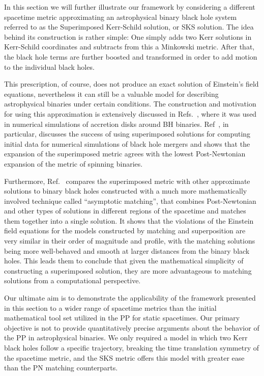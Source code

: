 In this section we will further illustrate our framework by considering a different spacetime metric approximating an astrophysical binary black hole system referred to as the Superimposed Kerr-Schild solution, or SKS solution. The idea behind its construction is rather simple: One simply adds two Kerr solutions in Kerr-Schild coordinates and subtracts from this a Minkowski metric. After that, the black hole terms are further boosted and transformed in order to add motion to the individual black holes.

This prescription, of course, does not produce an exact solution of Einstein's field equations, nevertheless it can still be a valuable model for describing astrophysical binaries under certain conditions. The construction and motivation for using this approximation is extensively discussed in Refs.~\cite{Armengol:2021shd, PhysRevD.104.044041}, where it was  used in numerical simulations of accretion disks around BH binaries. Ref~\cite{Armengol:2021shd}, in particular, discusses the success of using superimposed solutions for computing initial data for numerical simulations of black hole mergers and shows that the expansion of the superimposed metric agrees with the lowest Post-Newtonian expansion of the metric of spinning binaries.

Furthermore, Ref.~\cite{PhysRevD.104.044041} compares the superimposed metric with other approximate solutions to binary black holes constructed with a much more mathematically involved technique called ``asymptotic matching'', that combines Post-Newtonian and other types of solutions in different regions of the spacetime and matches them together into a single solution. It shows that the violations of the Einstein field equations for the models constructed by matching and superposition are very similar in their order of magnitude and profile, with the matching solutions being more well-behaved and smooth at larger distances from the binary black holes. This leads them to conclude that given the mathematical simplicity of constructing a superimposed solution, they are more advantageous to matching solutions from a computational perspective.

Our ultimate aim is to demonstrate the applicability of the framework presented in this section to a wider range of spacetime metrics than the initial mathematical tool set utilized in the PP for static spacetimes. Our primary objective is not to provide quantitatively precise arguments about the behavior of the PP in astrophysical binaries. We only required a model in which two Kerr black holes follow a specific trajectory, breaking the time translation symmetry of the spacetime metric, and the SKS metric offers this model with greater ease than the PN matching counterparts.

